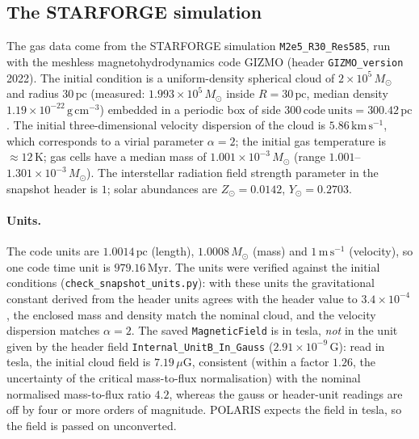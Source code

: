 \subsection{The STARFORGE simulation}
\label{sec:dataset:sim}

The gas data come from the STARFORGE \citep{Grudic2021} simulation \texttt{M2e5\_R30\_Res585}, run with the
meshless magnetohydrodynamics code GIZMO \citep{Hopkins2015} (header \texttt{GIZMO\_version} 2022). The initial
condition is a uniform-density spherical cloud of $2\times10^{5}\,M_\odot$ and radius $30\,\mathrm{pc}$ (measured:
$1.993\times10^{5}\,M_\odot$ inside $R=30\,\mathrm{pc}$, median density $1.19\times10^{-22}\,\mathrm{g\,cm^{-3}}$)
embedded in a periodic box of side $300\,\mathrm{code\ units}=300.42\,\mathrm{pc}$. The initial three-dimensional
velocity dispersion of the cloud is $5.86\,\mathrm{km\,s^{-1}}$, which corresponds to a virial parameter
$\alpha=2$; the initial gas temperature is $\approx12\,\mathrm{K}$; gas cells have a median mass of
$1.001\times10^{-3}\,M_\odot$ (range $1.001$--$1.301\times10^{-3}\,M_\odot$). The interstellar radiation field
strength parameter in the snapshot header is $1$; solar abundances are $Z_\odot=0.0142$, $Y_\odot=0.2703$.

\paragraph{Units.} The code units are $1.0014\,\mathrm{pc}$ (length), $1.0008\,M_\odot$ (mass) and
$1\,\mathrm{m\,s^{-1}}$ (velocity), so one code time unit is $979.16\,\mathrm{Myr}$. The units were verified
against the initial conditions (\texttt{check\_snapshot\_units.py}): with these units the gravitational constant
derived from the header units agrees with the header value to $3.4\times10^{-4}$, the enclosed mass and density
match the nominal cloud, and the velocity dispersion matches $\alpha=2$. The saved \texttt{MagneticField} is in
tesla, \emph{not} in the unit given by the header field \texttt{Internal\_UnitB\_In\_Gauss}
($2.91\times10^{-9}\,\mathrm{G}$): read in tesla, the initial cloud field is $7.19\,\mu\mathrm{G}$, consistent
(within a factor $1.26$, the uncertainty of the critical mass-to-flux normalisation) with the nominal
normalised mass-to-flux ratio $4.2$, whereas the gauss or header-unit readings are off by four or more
orders of magnitude. POLARIS expects the field in tesla, so the field is passed on unconverted.

